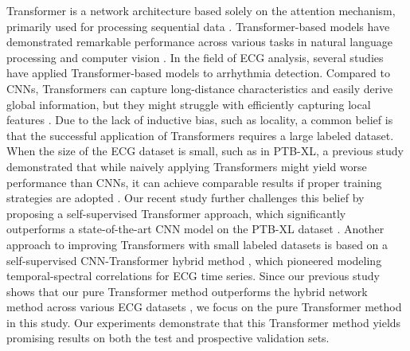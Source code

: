 \documentclass[11pt]{article}
\theoremstyle{definition}
\begin{document}
Transformer is a network architecture based solely on the attention mechanism, primarily used for processing sequential data \citep{vaswani2017attention}. Transformer-based models have demonstrated remarkable performance across various tasks in natural language processing and computer vision \citep{wen2022transformers}. In the field of ECG analysis, several studies have applied Transformer-based models to arrhythmia detection. Compared to CNNs, Transformers can capture long-distance characteristics and easily derive global information, but they might struggle with efficiently capturing local features \citep{han2022survey}. Due to the lack of inductive bias, such as locality, a common belief is that the successful application of Transformers requires a large labeled dataset. When the size of the ECG dataset is small, such as in PTB-XL, a previous study demonstrated that while naively applying Transformers might yield worse performance than CNNs, it can achieve comparable results if proper training strategies are adopted \citep{li2021bat}. Our recent study further challenges this belief by proposing a self-supervised Transformer approach, which significantly outperforms a state-of-the-art CNN model on the PTB-XL dataset \citep{zhou2023masked}. Another approach to improving Transformers with small labeled datasets is based on a self-supervised CNN-Transformer hybrid method \citep{zhang2022self}, which pioneered modeling temporal-spectral correlations for ECG time series. 
Since our previous study shows that our pure Transformer method outperforms the hybrid network method across various ECG datasets \citep{zhou2023masked}, we focus on the pure Transformer method in this study. 
Our experiments demonstrate that this Transformer method yields promising results on both the test and prospective validation sets.






\end{document}
